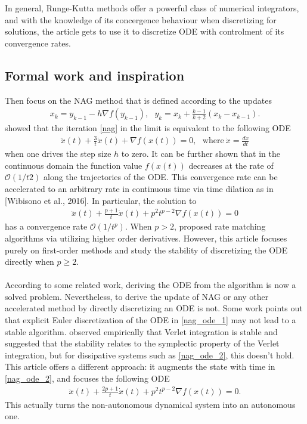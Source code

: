 In general, Runge-Kutta methods offer a powerful class of numerical integrators, and with the knowledge
of its concergence behaviour when discretizing for solutions, the article gets to use it
to discretize ODE with controlment of its convergence rates.

\subsection{Formal work and inspiration}

Then focus on the NAG method that is defined according to the updates
\begin{align}\label{nag}
  x_{k} = y_{k-1} - h \nabla f(y_{k-1}),\ \ \ y_{k} = x_{k} + \frac{k-1}{k+2} (x_{k} - x_{k-1}).
\end{align}
\textcite{JMLR:v17:15-084} showed that the iteration \eqref{nag} in the limit is equivalent to the
following ODE
\begin{align}\label{nag_ode_1}
  \ddot{x}(t) + \frac{3}{t} \dot{x}(t) + \nabla f(x(t)) = 0,\ \ \ \mathrm{where\ }
  \dot{x} = \frac{dx}{dt}
\end{align}
when one drives the step size $h$ to zero. It can be further shown that in the
continuous domain the function value $f(x(t))$ decreases at the rate of $\mathcal{O}(1/t2)$
along the trajectories of the ODE. This convergence rate can be accelerated to an
arbitrary rate in continuous time via time dilation as in [Wibisono et al., 2016].
In particular, the solution to
\begin{align}\label{nag_ode_2}
  \ddot{x}(t) + \frac{p+1}{t} \dot{x}(t) + p^{2}t^{p-2} \nabla f(x(t)) = 0
\end{align}
has a convergence rate $\mathcal{O}(1/t^{p})$. When $p > 2$, \textcite{doi:10.1073/pnas.1614734113} proposed rate matching
algorithms via utilizing higher order derivatives. However, this article focuses purely on
first-order methods and study the stability of discretizing the ODE directly when
$p \geq 2$.
\\\\According to some related work, deriving the ODE from the algorithm is now a solved
problem. Nevertheless, to derive the update of NAG or any other
accelerated method by directly discretizing an ODE is not. Some work points out that
explicit Euler discretization of the ODE in \eqref{nag_ode_1} may not lead to a stable
algorithm. \textcite{https://doi.org/10.48550/arxiv.1802.03653} observed empirically that Verlet
integration is stable and suggested that the stability relates to the symplectic
property of the Verlet integration, but for dissipative systems such as \eqref{nag_ode_2},
this doesn't hold. This article offers a different approach: it augments the state with
time in \eqref{nag_ode_2}, and focuses the following ODE
\begin{align}\label{nag_ode_final}
  \ddot{x}(t) + \frac{2p+1}{t} \dot{x}(t) + p^{2}t^{p-2} \nabla f(x(t)) = 0.
\end{align}
This actually turns the non-autonomous dynamical system into an autonomous one.

